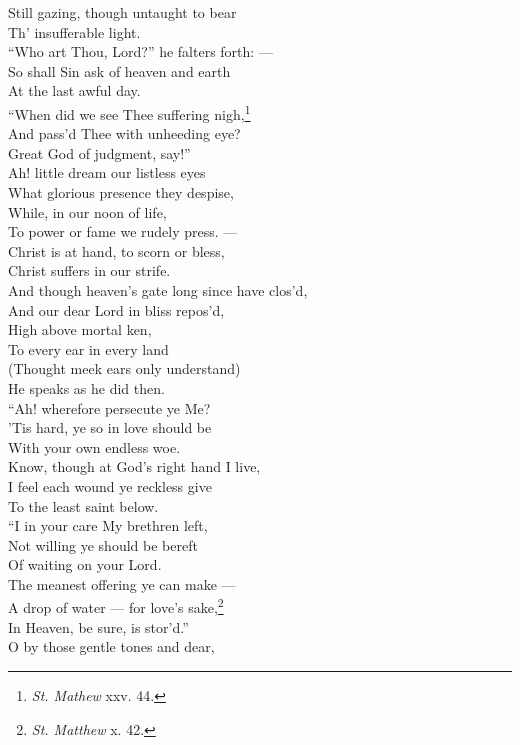  Still gazing, though untaught to bear \\
 Th’ insufferable light. \\
  “Who art Thou, Lord?” he falters forth: — \\
 So shall Sin ask of heaven and earth \\
 At the last awful day. \\
 “When did we see Thee suffering nigh,\footnote{\emph{St. Mathew} xxv. 44.} \\
 And pass’d Thee with unheeding eye? \\
 Great God of judgment, say!” \\
  Ah! little dream our listless eyes \\
 What glorious presence they despise, \\
 While, in our noon of life, \\
 To power or fame we rudely press. — \\
 Christ is at hand, to scorn or bless, \\
 Christ suffers in our strife. \\
  And though heaven’s gate long since have clos’d, \\
 And our dear Lord in bliss repos’d, \\
 High above mortal ken, \\
 To every ear in every land \\
 (Thought meek ears only understand) \\
 He speaks as he did then. \\
  “Ah! wherefore persecute ye Me? \\
 ’Tis hard, ye so in love should be \\
 With your own endless woe. \\
 Know, though at God’s right hand I live, \\
 I feel each wound ye reckless give \\
 To the least saint below. \\
  “I in your care My brethren left, \\
 Not willing ye should be bereft \\
 Of waiting on your Lord. \\
 The meanest offering ye can make — \\
 A drop of water — for love’s sake,\footnote{\emph{St. Matthew} x. 42.} \\
 In Heaven, be sure, is stor’d.” \\
  O by those gentle tones and dear, \\

